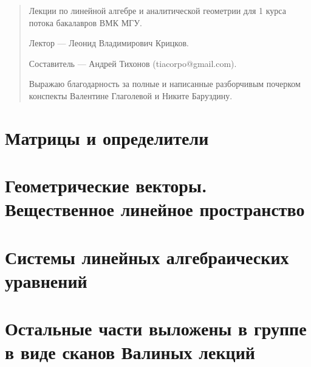 \documentclass[draft]{report}
\theoremstyle{remark}
\begin{document}
\begin{abstract}
Лекции по линейной алгебре и аналитической геометрии для 1 курса потока бакалавров ВМК МГУ.

Лектор --- Леонид Владимирович Крицков.

Составитель --- Андрей Тихонов (tiacorpo@gmail.com).

Выражаю благодарность за полные и написанные разборчивым почерком конспекты Валентине Глаголевой и Никите Баруздину.
\end{abstract}
\tableofcontents
\part{Матрицы и определители}

\part{Геометрические векторы. Вещественное линейное пространство}

\part{Системы линейных алгебраических уравнений}

\part{Остальные части выложены в группе в виде сканов Валиных лекций}
%
%
\end{document}
